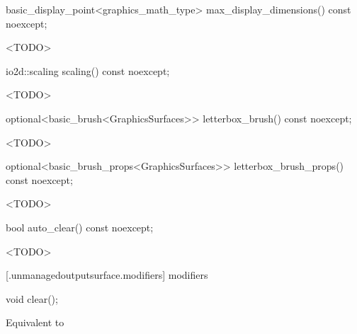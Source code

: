 %
\begin{itemdecl}
basic_display_point<graphics_math_type> max_display_dimensions() const noexcept;
\end{itemdecl}
\begin{itemdescr}
\pnum
\returns
<TODO>
\end{itemdescr}

%
\begin{itemdecl}
io2d::scaling scaling() const noexcept;
\end{itemdecl}
\begin{itemdescr}
\pnum
\returns
<TODO>
\end{itemdescr}

%
\begin{itemdecl}
optional<basic_brush<GraphicsSurfaces>> letterbox_brush() const noexcept;
\end{itemdecl}
\begin{itemdescr}
\pnum
\returns
<TODO>
\end{itemdescr}

%
\begin{itemdecl}
optional<basic_brush_props<GraphicsSurfaces>> letterbox_brush_props() const 
  noexcept;
\end{itemdecl}
\begin{itemdescr}
\pnum
\returns
<TODO>
\end{itemdescr}

%
\begin{itemdecl}
bool auto_clear() const noexcept;
\end{itemdecl}
\begin{itemdescr}
\pnum
\returns
<TODO>
\end{itemdescr}

 [\iotwod.unmanagedoutputsurface.modifiers] { modifiers}

%
\begin{itemdecl}
void clear();
\end{itemdecl}
\begin{itemdescr}
\pnum
\effects
\effects
Equivalent to 
\end{itemdescr}


